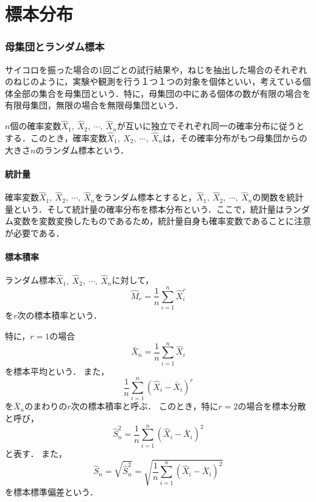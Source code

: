 \part{標本分布}

\section{母集団とランダム標本}
サイコロを振った場合の1回ごとの試行結果や，ねじを抽出した場合のそれぞれのねじのように，実験や観測を行う１つ１つの対象を個体といい，考えている個体全部の集合を母集団という．特に，母集団の中にある個体の数が有限の場合を有限母集団，無限の場合を無限母集団という．




$n$個の確率変数$\hat{X}_1,\ \hat{X}_2,\ \cdots,\ \hat{X}_n$が互いに独立でそれぞれ同一の確率分布に従うとする．このとき，確率変数$\hat{X}_1,\ \hat{X}_2,\ \cdots,\ \hat{X}_n$は，その確率分布がもつ母集団からの大きさ$n$のランダム標本という．

\subsection*{統計量}
確率変数$\hat{X}_1,\ \hat{X}_2,\ \cdots,\ \hat{X}_n$をランダム標本とすると，$\hat{X}_1,\ \hat{X}_2,\ \cdots,\ \hat{X}_n$の関数を統計量という．そして統計量の確率分布を標本分布という．ここで，統計量はランダム変数を変数変換したものであるため，統計量自身も確率変数であることに注意が必要である．



\subsection{標本積率}
ランダム標本$\hat{X}_1,\ \hat{X}_2,\ \cdots,\ \hat{X}_n$に対して，
\begin{equation}
    \hat{M}_{r} = \frac{1}{n} \sum_{i=1}^{n} \hat{X}_i^r
\end{equation}
を$r$次の標本積率という．

特に，$r=1$の場合
\begin{equation}
    \bar{X}_n = \frac{1}{n} \sum_{i=1}^{n} \hat{X}_i
\end{equation}
を標本平均という．
また，
\begin{equation}
    \frac{1}{n} \sum_{i=1}^{n} (\hat{X}_i - \bar{X}_i)^r
\end{equation}
を$\bar{X}_{n}$のまわりの$r$次の標本積率と呼ぶ．
このとき，特に$r=2$の場合を標本分散と呼び，
\begin{equation}
    \hat{S}_{n}^2 = \frac{1}{n}
    \sum_{i=1}^{n} (\hat{X}_i - \bar{X}_i)^2
\end{equation}
と表す．
また，
\begin{equation}
    \hat{S}_{n}=\sqrt{\hat{S}_{n}^2} = 
    \sqrt{
    \frac{1}{n}
    \sum_{i=1}^{n} (\hat{X}_i - \bar{X}_i)^2}
\end{equation}
を標本標準偏差という．

